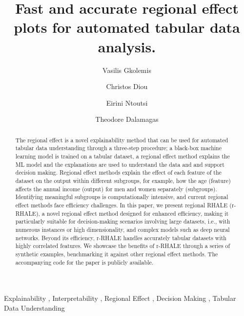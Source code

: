 \documentclass[
twocolumn,
]{ceurart}
\begin{document}


\title{Fast and accurate regional effect plots for automated tabular data analysis.}

\author[1,2]{Vasilis Gkolemis}
\address[1]{Harokopio University of Athens}
\address[2]{ATHENA Research Center}
\author[1]{Christos Diou}
\author[3]{Eirini Ntoutsi}
\address[3]{University of the Bundeswehr Munich}
\author[2]{Theodore Dalamagas}


\begin{abstract}
The regional effect is a novel explainability method that can be used for automated tabular data understanding through a three-step procedure; a black-box machine learning model is trained on a tabular dataset, a regional effect method explains the ML model and the explanations are used to understand the data and and support decision making.  Regional effect methods explain the effect of each feature of the dataset on the output within different subgroups, for example, how the age (feature) affects the annual income (output) for men and women separately (subgroups). Identifying meaningful subgroups is computationally intensive, and current regional effect methods face efficiency challenges.  In this paper, we present regional RHALE (r-RHALE), a novel regional effect method designed for enhanced efficiency, making it particularly suitable for decision-making scenarios involving large datasets, i.e., with numerous instances or high dimensionality, and complex models such as deep neural networks. Beyond its efficiency, r-RHALE handles accurately tabular datasets with highly correlated features. We showcase the benefits of r-RHALE through a series of synthetic examples, benchmarking it against other regional effect methods. The accompanying code for the paper is publicly available.
\end{abstract}

\begin{keywords}
  Explainability \sep
  Interpretability \sep
  Regional Effect \sep
  Decision Making \sep
  Tabular Data Understanding
\end{keywords}
\end{document}
